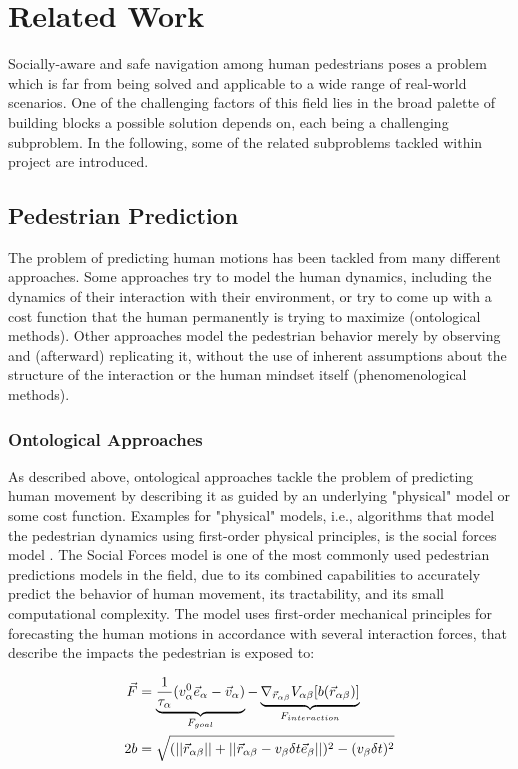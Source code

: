 \chapter{Related Work}
\label{text:related}
Socially-aware and safe navigation among human pedestrians poses a problem which is far from being solved and applicable to a wide range of real-world scenarios. One of the challenging factors of this field lies in the broad palette of building blocks a possible solution depends on, each being a challenging subproblem. In the following, some of the related subproblems tackled within project \project are introduced.

\section{Pedestrian Prediction}
\label{text:related/prediction}
The problem of predicting human motions has been tackled from many different approaches. Some approaches try to model the human dynamics, including the dynamics of their interaction with their environment, or try to come up with a cost function that the human permanently is trying to maximize (ontological methods). Other approaches model the pedestrian behavior merely by observing and (afterward) replicating it, without the use of inherent assumptions about the structure of the interaction or the human mindset itself (phenomenological methods).

\subsection{Ontological Approaches}
As described above, ontological approaches tackle the problem of predicting human movement by describing it as guided by an underlying "physical" model or some cost function. Examples for "physical" models, i.e., algorithms that model the pedestrian dynamics using first-order physical principles, is the social forces model \cite{Helbing1995}. The Social Forces model is one of the most commonly used pedestrian predictions models in the field, due to its combined capabilities to accurately predict the behavior of human movement, its tractability, and its small computational complexity. The model uses first-order mechanical principles for forecasting the human motions in accordance with several interaction forces, that describe the impacts the pedestrian is exposed to:

\begin{align}
\vec{F} &= \underbrace{\frac{1}{\tau_{\alpha}} (v^0_{\alpha} \vec{e}_{\alpha} - \vec{v}_{\alpha})}_{F_{goal}} - \underbrace{\nabla_{\vec{r}_{\alpha \beta}} V_{\alpha \beta}[b(\vec{r}_{\alpha \beta})]}_{F_{interaction}} 
\label{eq:social_forces} \\
2b &= \sqrt{(||\vec{r}_{\alpha \beta}|| + ||\vec{r}_{\alpha \beta} - v_{\beta} \delta t \vec{e}_{\beta}||)^2 - (v_{\beta} \delta t)^2}
\end{align}

